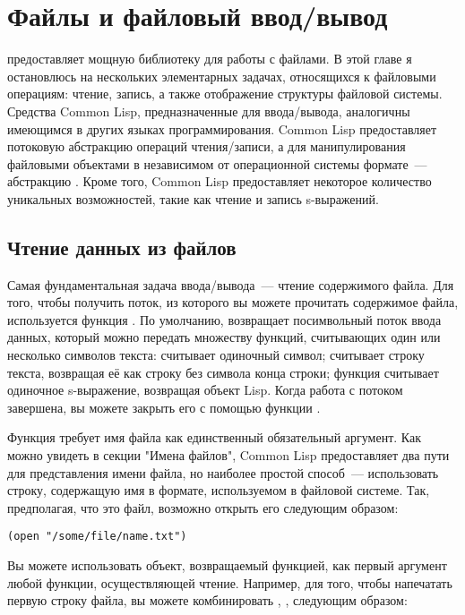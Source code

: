 \chapter{Файлы и файловый ввод/вывод}
\label{ch:14}

 предоставляет мощную библиотеку для работы с файлами. В этой главе я
остановлюсь на нескольких элементарных задачах, относящихся к файловыми операциям: чтение,
запись, а также отображение структуры файловой системы. Средства Common Lisp,
предназначенные для ввода/вывода, аналогичны имеющимся в других языках
программирования. Common Lisp предоставляет потоковую абстракцию операций чтения/записи, а
для манипулирования файловыми объектами в независимом от операционной системы формате~---
абстракцию . Кроме того, Common Lisp предоставляет некоторое
количество уникальных возможностей, такие как чтение и запись s-выражений.

\section{Чтение данных из файлов}

Самая фундаментальная задача ввода/вывода~--- чтение содержимого файла. Для того, чтобы
получить поток, из которого вы можете прочитать содержимое файла, используется функция
. По умолчанию,  возвращает посимвольный поток ввода данных, который
можно передать множеству функций, считывающих один или несколько символов текста:
 считывает одиночный символ;  считывает строку текста,
возвращая её как строку без символа конца строки; функция  считывает одиночное
s-выражение, возвращая объект Lisp. Когда работа с потоком завершена, вы можете закрыть
его с помощью функции .

Функция  требует имя файла как единственный обязательный аргумент. Как можно
увидеть в секции "Имена файлов", Common Lisp предоставляет два пути для представления
имени файла, но наиболее простой способ~--- использовать строку, содержащую имя в формате,
используемом в файловой системе. Так, предполагая, что  это
файл, возможно открыть его следующим образом:

\begin{lstlisting}
(open "/some/file/name.txt")
\end{lstlisting}

Вы можете использовать объект, возвращаемый функцией, как первый аргумент любой функции,
осуществляющей чтение. Например, для того, чтобы напечатать первую строку файла, вы можете
комбинировать , ,  следующим образом:

